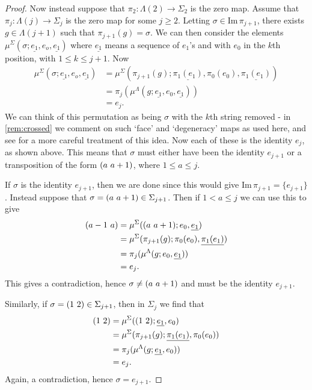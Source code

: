 \begin{proof}
Now instead suppose that $\pi_2 \colon \Lambda(2) \rightarrow \Sigma_2$ is the zero map. Assume that $\pi_j \colon \Lambda(j) \rightarrow \Sigma_j$ is the zero map for some $j \geq 2$. Letting $\sigma \in \textrm{Im}\,\pi_{j+1}$, there exists $g \in \Lambda(j+1)$ such that $\pi_{j+1}(g) = \sigma$. We can then consider the elements $\mu^\Sigma(\sigma; \underline{e_1}, e_o, \underline{e_1})$ where $\underline{e_1}$ means a sequence of $e_1$'s and with $e_0$ in the $k$th position, with $1 \leq k \leq j + 1$. Now
  \begin{align*}
    \mu^\Sigma(\sigma; \underline{e_1}, e_o, \underline{e_1}) &= \mu^\Sigma(\pi_{j+1}(g); \underline{\pi_1(e_1)}, \pi_0(e_0), \underline{\pi_1(e_1)}) \\
    &= \pi_j(\mu^\Lambda(g; \underline{e_1}, e_0, \underline{e_1})) \\
    &= e_j.
  \end{align*}
We can think of this permutation as being $\sigma$ with the $k$th string removed - in \cref{rem:crossed} we comment on such `face' and `degeneracy' maps as used here, and see \cite{ber-simplicial} for a more careful treatment of this idea. Now each of these is the identity $e_j$, as shown above. This means that $\sigma$ must either have been the identity $e_{j+1}$ or a transposition of the form $( a \, \, a+1 )$, where $1 \leq a \leq j$.

If $\sigma$ is the identity $e_{j+1}$, then we are done since this would give $\textrm{Im}\,\pi_{j+1} = \{e_{j+1}\}$. Instead suppose that $\sigma = ( a \, \, a+1 ) \in \Sigma_{j + 1}$. Then if $1 < a \leq j$ we can use this to give
  \begin{align*}
    ( a-1 \, \, a ) &= \mu^\Sigma(( a \, \, a+1 ); e_0, \underline{e_1}) \\
    &= \mu^\Sigma(\pi_{j+1}(g);\pi_0(e_0), \underline{\pi_1(e_1)}) \\
    &= \pi_j(\mu^\Lambda(g; e_0, \underline{e_1})) \\
    &= e_j.
  \end{align*}
This gives a contradiction, hence $\sigma \neq ( a \, \, a+1 )$ and must be the identity $e_{j+1}$.

Similarly, if $\sigma = ( 1 \, \, 2 ) \in \Sigma_{j+1}$, then in $\Sigma_j$ we find that
  \begin{align*}
    ( 1 \, \, 2 ) &= \mu^\Sigma(( 1 \, \, 2 ) ; \underline{e_1}, e_0) \\
    &= \mu^\Sigma(\pi_{j+1}(g); \underline{\pi_1(e_1)}, \pi_0(e_0)) \\
    &= \pi_j(\mu^\Lambda(g ; \underline{e_1}, e_0)) \\
    &= e_j.
  \end{align*}
Again, a contradiction, hence $\sigma = e_{j+1}$.
\end{proof}

